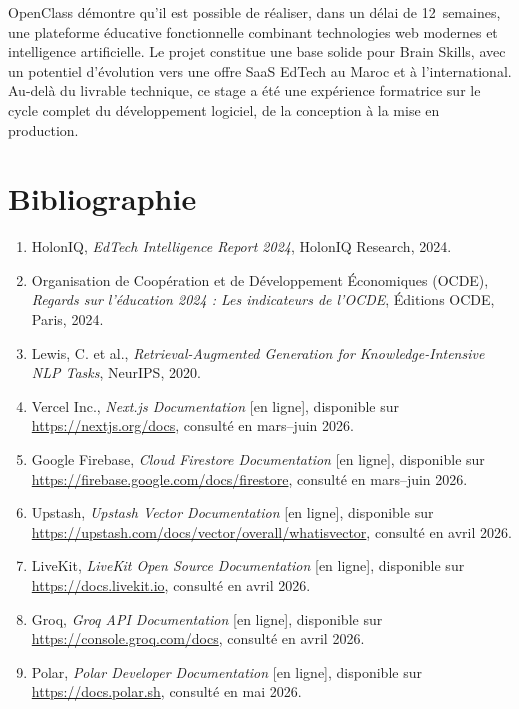\documentclass[12pt, a4paper, twoside]{report}
\begin{document}
OpenClass démontre qu'il est possible de réaliser, dans un délai de 12~semaines,
une plateforme éducative fonctionnelle combinant technologies web modernes et
intelligence artificielle. Le projet constitue une base solide pour Brain Skills,
avec un potentiel d'évolution vers une offre SaaS EdTech au Maroc et à
l'international. Au-delà du livrable technique, ce stage a été une expérience
formatrice sur le cycle complet du développement logiciel, de la conception à la
mise en production.

\chapter*{Bibliographie}

\begin{enumerate}
  \item HolonIQ, \textit{EdTech Intelligence Report 2024}, HolonIQ Research, 2024.
  \item Organisation de Coopération et de Développement Économiques (OCDE),
        \textit{Regards sur l'éducation 2024 : Les indicateurs de l'OCDE}, Éditions
        OCDE, Paris, 2024.
  \item Lewis, C. et al., \textit{Retrieval-Augmented Generation for
        Knowledge-Intensive NLP Tasks}, NeurIPS, 2020.
  \item Vercel Inc., \textit{Next.js Documentation} [en ligne], disponible sur
        \url{https://nextjs.org/docs}, consulté en mars--juin 2026.
  \item Google Firebase, \textit{Cloud Firestore Documentation} [en ligne],
        disponible sur \url{https://firebase.google.com/docs/firestore}, consulté
        en mars--juin 2026.
  \item Upstash, \textit{Upstash Vector Documentation} [en ligne], disponible sur
        \url{https://upstash.com/docs/vector/overall/whatisvector}, consulté en
        avril 2026.
  \item LiveKit, \textit{LiveKit Open Source Documentation} [en ligne], disponible
        sur \url{https://docs.livekit.io}, consulté en avril 2026.
  \item Groq, \textit{Groq API Documentation} [en ligne], disponible sur
        \url{https://console.groq.com/docs}, consulté en avril 2026.

  \item Polar, \textit{Polar Developer Documentation} [en ligne], disponible sur
        \url{https://docs.polar.sh}, consulté en mai 2026.
\end{enumerate}
\end{document}
